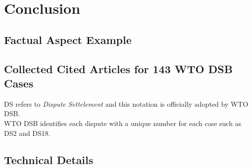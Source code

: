 \documentclass[12pt,letterpaper]{article}
\begin{document}
% 

\section{Conclusion}


\clearpage 

\clearpage
\begin{appendices}
\section{}
\label{sec:appendix}
% 


\subsection{Factual Aspect Example}
\label{sub:factual-aspect-example}




\subsection{Collected Cited Articles for 143 WTO DSB Cases}
DS refers to \textit{Dispute Settelement} and this notation is officially adopted by WTO DSB.\\
WTO DSB identifies each dispute with a unique number for each case such as DS2 and DS18.
\label{sub:cited-articles-table}


\subsection{Technical Details}
\label{sub:technicial-details}



% 
\end{appendices}
\end{document}
